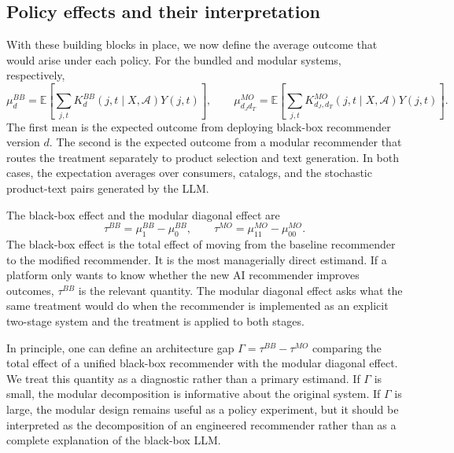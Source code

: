 \documentclass[11pt]{article}
\newcommand{\Expect}{\mathbb{E}}
\newcommand{\Y}{Y}
\newcommand{\catalog}{\mathcal{A}}
\begin{document}
\subsection{Policy effects and their interpretation}

With these building blocks in place, we now define the average outcome that would arise under each policy. For the bundled and modular systems, respectively,
\begin{equation}
\mu_d^{BB} = \Expect\!\left[\sum_{j,t} K^{BB}_d(j,t \mid X,\catalog)\Y(j,t)\right], \qquad \mu_{d_Jd_T}^{MO} = \Expect\!\left[\sum_{j,t} K^{MO}_{d_J,d_T}(j,t \mid X,\catalog)\Y(j,t)\right].
\label{eq:policy-means}
\end{equation}
The first mean is the expected outcome from deploying black-box recommender version $d$. The second is the expected outcome from a modular recommender that routes the treatment separately to product selection and text generation. In both cases, the expectation averages over consumers, catalogs, and the stochastic product-text pairs generated by the LLM.

The black-box effect and the modular diagonal effect are
\begin{equation}
\tau^{BB} = \mu_1^{BB} - \mu_0^{BB}, \qquad \tau^{MO} = \mu_{11}^{MO} - \mu_{00}^{MO}.
\label{eq:main-policy-effects}
\end{equation}
The black-box effect is the total effect of moving from the baseline recommender to the modified recommender. It is the most managerially direct estimand. If a platform only wants to know whether the new AI recommender improves outcomes, $\tau^{BB}$ is the relevant quantity. The modular diagonal effect asks what the same treatment would do when the recommender is implemented as an explicit two-stage system and the treatment is applied to both stages.

In principle, one can define an architecture gap $\Gamma = \tau^{BB} - \tau^{MO}$ comparing the total effect of a unified black-box recommender with the modular diagonal effect. We treat this quantity as a diagnostic rather than a primary estimand. If $\Gamma$ is small, the modular decomposition is informative about the original system. If $\Gamma$ is large, the modular design remains useful as a policy experiment, but it should be interpreted as the decomposition of an engineered recommender rather than as a complete explanation of the black-box LLM.
\end{document}
